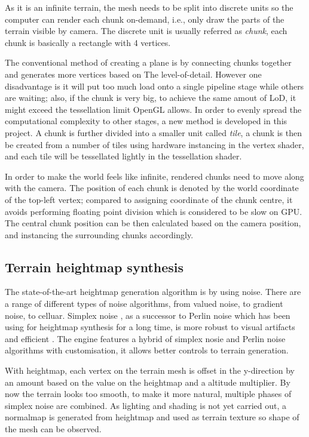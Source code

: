 \documentclass[oneside, a4paper]{article}
\begin{document}
    As it is an infinite terrain, the mesh needs to be split into discrete units so the computer can render each chunk on-demand, i.e., only draw the parts of the terrain visible by camera. The discrete unit is usually referred as \textit{chunk}, each chunk is basically a rectangle with 4 vertices.

    The conventional method of creating a plane is by connecting chunks together and generates more vertices based on The level-of-detail. However one disadvantage is it will put too much load onto a single pipeline stage while others are waiting; also, if the chunk is very big, to achieve the same amout of LoD, it might exceed the tessellation limit OpenGL allows. In order to evenly spread the computational complexity to other stages, a new method is developed in this project. A chunk is further divided into a smaller unit called \textit{tile}, a chunk is then be created from a number of tiles using hardware instancing in the vertex shader, and each tile will be tessellated lightly in the tessellation shader.

    In order to make the world feels like infinite, rendered chunks need to move along with the camera. The position of each chunk is denoted by the world coordinate of the top-left vertex; compared to assigning coordinate of the chunk centre, it avoids performing floating point division which is considered to be slow on GPU. The central chunk position can be then calculated based on the camera position, and instancing the surrounding chunks accordingly.

    \subsection{Terrain heightmap synthesis}

    The state-of-the-art heightmap generation algorithm is by using noise. There are a range of different types of noise algorithms, from valued noise, to gradient noise, to celluar. Simplex noise \cite{simplex_noise}, as a successor to Perlin noise \cite{perlin_noise} which has been using for heightmap synthesis for a long time, is more robust to visual artifacts and efficient \cite{improved_perlin}. The engine features a hybrid of simplex nosie and Perlin noise \cite{simplex_demystified} algorithms with customisation, it allows better controls to terrain generation.

    With heightmap, each vertex on the terrain mesh is offset in the y-direction by an amount based on the value on the heightmap and a altitude multiplier. By now the terrain looks too smooth, to make it more natural, multiple phases of simplex noise are combined. As lighting and shading is not yet carried out, a normalmap is generated from heightmap and used as terrain texture so shape of the mesh can be observed.
\end{document}
